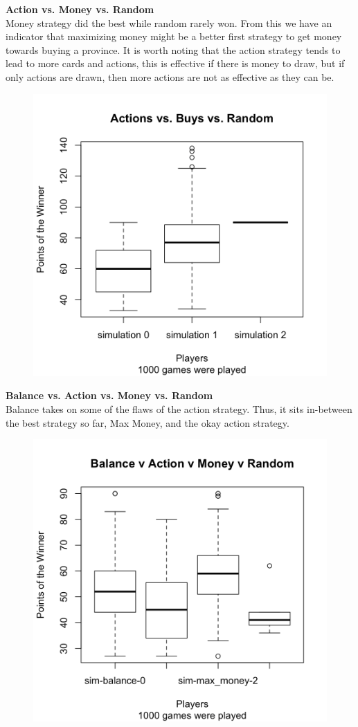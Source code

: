 \documentclass[11pt, oneside]{article}   	%
\begin{document}
\textbf{Action vs. Money vs. Random} \\

Money strategy did the best while random rarely won. From this we have an indicator that maximizing money might be a better first strategy to get money towards buying a province. It is worth noting that the action strategy tends to lead to more cards and actions, this is effective if there is money to draw, but if only actions are drawn, then more actions are not as effective as they can be. 

\begin{figure}[H]
\includegraphics[width=.75\textwidth]{action_buy_random}
\centering
\end{figure}


\textbf{Balance vs. Action vs. Money vs. Random}\\

Balance takes on some of the flaws of the action strategy. Thus, it sits in-between the best strategy so far, Max Money, and the okay action strategy. 

\begin{figure}[H]
\includegraphics[width=.75\textwidth]{all_strat}
\centering
\end{figure}
\end{document}
